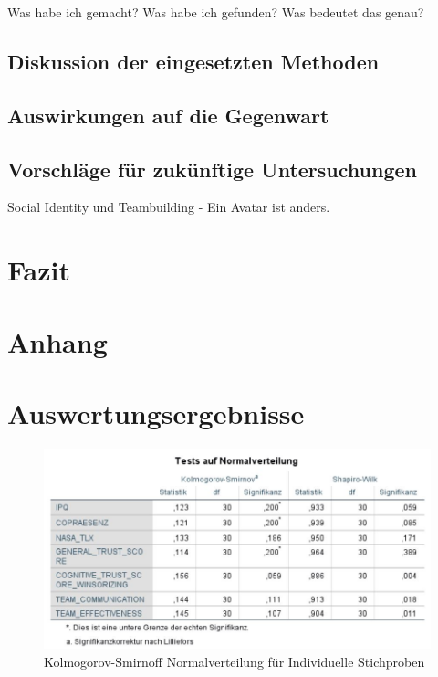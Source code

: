 \documentclass[a4paper,11pt]{article}%
\renewcommand{\\}{\vspace*{0.5\baselineskip} \newline}
\begin{document}
	Was habe ich gemacht?
	Was habe ich gefunden? 
	Was bedeutet das genau?
	\subsection{Diskussion der eingesetzten Methoden}
	\subsection{Auswirkungen auf die Gegenwart}
	\subsection{Vorschläge für zukünftige Untersuchungen}
		Social Identity und Teambuilding - Ein Avatar ist anders.
	
\section{Fazit}
\newpage




	\newpage
	\appendix	
\section*{Anhang}

\section{Auswertungsergebnisse}
	
	\begin{figure}[H]
	\centering
		\begin{footnotesize}
			\includegraphics[scale=0.6]{Abbildungen/Post_QuestionnaireStatistiks/Normalverteilung_30}\\
			\caption{Kolmogorov-Smirnoff Normalverteilung für Individuelle Stichproben}
			\label{fig:KolSmirInd}
		\end{footnotesize}
	\end{figure}	
	
\end{document}
